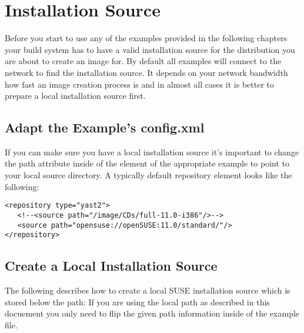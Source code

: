 \chapter{Installation Source}
\label{chapter:instsourcesetup}
\minitoc

Before you start to use any of the examples provided in the following
chapters your build system has to have a valid installation source for
the distribution you are about to create an image for.
By default all examples will connect to the network to find the
installation source. It depends on your network bandwidth how fast
an image creation process is and in almost all cases it is better
to prepare a local installation source first.

\section{Adapt the Example's config.xml}
If you can make
sure you have a local installation source it's important to change
the path attribute inside of the  element of the
appropriate example to point to your local source directory.
A typically default repository element looks like the following:

\begin{verbatim}
<repository type="yast2">
   <!--<source path="/image/CDs/full-11.0-i386"/>-->
   <source path="opensuse://openSUSE:11.0/standard/"/>
</repository>
\end{verbatim}

\section{Create a Local Installation Source}
The following describes how to create a local SUSE installation
source which is stored below the path: 
If you are using the local path as described in this docuement
you only need to flip the given path information inside of
the example  file.

